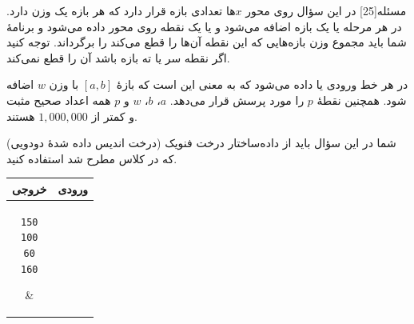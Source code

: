 ‌مسئله[25]
در این سؤال روی محور $x$ها تعدادی بازه قرار دارد که هر بازه یک وزن دارد. در هر مرحله یا یک بازه اضافه می‌شود و یا یک نقطه روی محور داده می‌شود و برنامۀ شما باید مجموع وزن بازه‌هایی که این نقطه آن‌ها را قطع می‌کند را برگرداند. توجه کنید اگر نقطه سر یا ته بازه باشد آن را قطع نمی‌کند.

در هر خط ورودی یا 
 داده می‌شود که به معنی این است که بازۀ $[a, b]$ با وزن $w$ اضافه شود. همچنین 
 نقطۀ $p$ را مورد پرسش قرار می‌دهد.
$a$، $b$، $w$ و $p$ همه اعداد صحیح مثبت و کمتر از $1,000,000$ هستند.

شما در این سؤال باید از داده‌ساختار درخت فنویک (درخت اندیس داده شدۀ دودویی) که در کلاس مطرح شد استفاده کنید.

\begin{center}
	\begin{tabular}{|c|c|}
		\hline
		خروجی                 
		& ورودی    \\ \hline
		\parbox[t]{5cm}{\normalsize\raggedright{\texttt{150\\100\\60\\160}}\vspace{0.2cm}} &
		\parbox[t]{5cm}{\normalsize\raggedright{}\vspace{0.2cm}}\\\hline
	\end{tabular}
\end{center}







